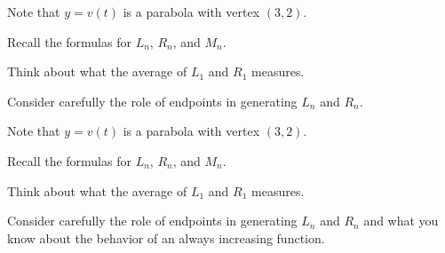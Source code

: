 \begin{smallhint}
\ba
	\item Note that $y = v(t)$ is a parabola with vertex $(3,2)$.
	\item Recall the formulas for $L_n$, $R_n$, and $M_n$.
	\item Think about what the average of $L_1$ and $R_1$ measures.
	\item Consider carefully the role of endpoints in generating $L_n$ and $R_n$.
\ea
\end{smallhint}
\begin{bighint}
\ba
	\item Note that $y = v(t)$ is a parabola with vertex $(3,2)$.
	\item Recall the formulas for $L_n$, $R_n$, and $M_n$.
	\item Think about what the average of $L_1$ and $R_1$ measures.
	\item Consider carefully the role of endpoints in generating $L_n$ and $R_n$ and what you know about the behavior of an always increasing function.
\ea
\end{bighint}
